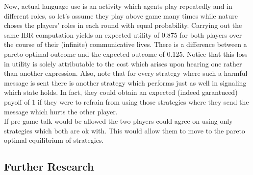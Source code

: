 \documentclass{article}
\begin{document}
Now,  actual language use is an activity which agents play repeatedly and in different roles, so let's assume they play above game many times while nature choses the players' roles in each round with equal probability. Carrying out the same IBR computation yields an expected utility of 0.875 for both players over the course of their (infinite) communicative lives. There is a difference between a pareto optimal outcome and the expected outcome of 0.125. Notice that this loss in utility is solely attributable to the cost which arises upon hearing one rather than another expression. Also, note that for every strategy where such a harmful message is sent there is another strategy which performs just as well in signaling which state holds. In fact, they could obtain an expected (indeed garantueed) payoff of 1 if they were to refrain from using those strategies where they send the message which hurts the other player.\\
If pre-game talk would be allowed the two players could agree on using only strategies which both are ok with. This would allow them to move to the pareto optimal equilibrium of strategies.

\begin{comment}
Starting from Spence's seminal "Job Market Signalling", much has been written about games where by sending a message an agent causes a cost. This is the core of so-called \textit{costly signalling games}. Particularly economic theory has been interested in this twist of the Lewisian signaling model.\\
Common assumptions here are that the message's meaning is determined before the start of the game and that sender's cost vector is common knowledge, which, in turn, allows the receiver to distinguish credible and non-credible signals.\\


\begin{table}[h]
\centering
\begin{tabular}{lllll}
States & Cost Sender & Messages & {Cost Receiver} & {Actions} \\ 
$t_1$  & c           & $m_1$    & 0                                  & $a_1$                        \\
$t_2$  & c           & $m_2$    & 0                                  & $a_2$                       
\end{tabular}
\end{table} 
\end{comment}

\subsection{Further Research}
\end{document}

